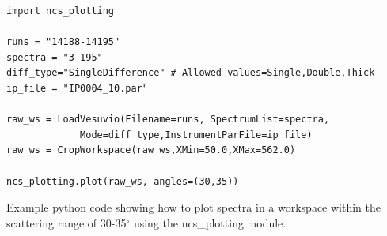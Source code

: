 \documentclass[paper=a4, fontsize=11pt]{scrartcl}	%
\numberwithin{equation}{section}															%
\numberwithin{figure}{section}																%
\numberwithin{table}{section}
\begin{document}
\begin{listing}[H]
\begin{verbatim}
import ncs_plotting

runs = "14188-14195"
spectra = "3-195"
diff_type="SingleDifference" # Allowed values=Single,Double,Thick
ip_file = "IP0004_10.par"

raw_ws = LoadVesuvio(Filename=runs, SpectrumList=spectra,
		     Mode=diff_type,InstrumentParFile=ip_file)
raw_ws = CropWorkspace(raw_ws,XMin=50.0,XMax=562.0)

ncs_plotting.plot(raw_ws, angles=(30,35))
\end{verbatim}
\caption{Example python code showing how to plot spectra in a workspace within the scattering range of 30-35$^\circ$ using the ncs\_plotting module.}
\label{lst:plot-angle}
\end{listing}
\end{document}
